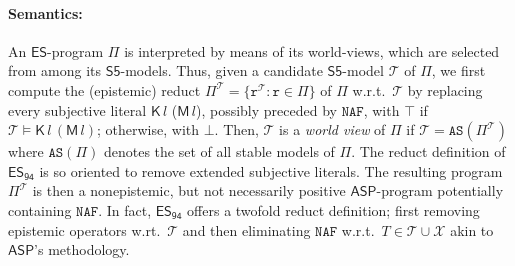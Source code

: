 \documentclass[submission,copyright,creativecommons]{eptcs}
\newcommand{\logic}[1]  { \ensuremath{\mathsf{#1}} }
\newcommand{\sfive}  { \logic{S5} }
\newcommand{\ASP}  { \logic{ASP} }
\newcommand{\ES}  { \logic{ES} }
\newcommand{\naf}  { \texttt{NAF} }
\newcommand{\anset}  { \texttt{AS} }
\newcommand{\epispec}  { \Pi }
\newcommand{\K}  { \mathsf{K} }
\newcommand{\M}  { \mathsf{M} }
\newcommand{\ESdoksandort}  { \logic{ES_{\scriptscriptstyle{94}} } }
\begin{document}
\paragraph{Semantics:} 
\label{sec:ES94 Semantics}
An $\ES$-program $\epispec$ is interpreted by means of its world-views, which are 
selected from among its $\sfive$-models. Thus,
given a candidate $\sfive$-model $\mathcal T$ of $\epispec$,
we first compute the (epistemic) reduct $\epispec^\mathcal{T} = \{ \mathtt{r}^\mathcal{T} : 
\mathtt{r} \in \epispec \}$
of $\epispec$ w.r.t.\ $\mathcal{T}$ by
replacing every subjective literal $\K\,l$ ($\M\,l$), possibly preceded by $\naf$, 
with $\top$ if  $\mathcal T \models \K\,l \, (\M\,l)$; otherwise, with $\bot$.
Then, $\mathcal{T}$ is a \emph{world view} of $\epispec$ if
$\mathcal T = \anset(\epispec^\mathcal T)$ where
$\anset(\epispec)$ denotes the set of all stable models of $\epispec$.
%
The reduct definition of $\ESdoksandort$
is so oriented to remove extended subjective literals.
The resulting program $\epispec^{\mathcal T}$
is then a nonepistemic, but not necessarily positive
$\ASP$-program potentially containing $\naf$. In fact, $\ESdoksandort$
offers a twofold reduct definition; first removing epistemic operators 
w.rt.\ $\mathcal T$ and then eliminating $\naf$ w.r.t.\ $T \in \mathcal T \cup \mathcal X$ akin to $\ASP$'s methodology.

\end{document}
